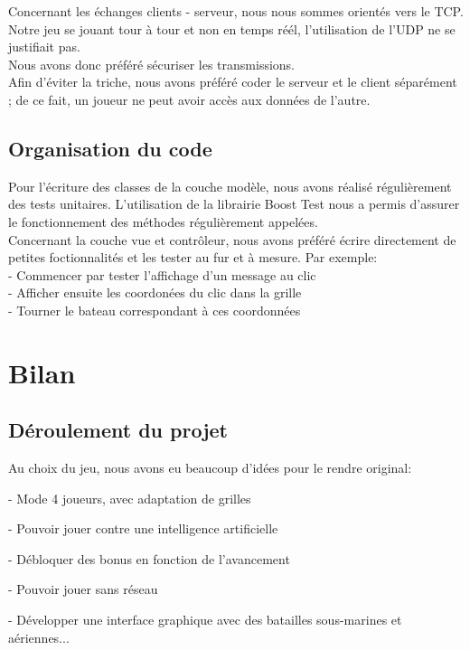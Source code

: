 \documentclass[a4paper,oneside]{article}
\begin{document}
Concernant les échanges clients - serveur, nous nous sommes orientés vers le TCP. 
Notre jeu se jouant tour à tour et non en temps réél, l'utilisation de l'UDP ne se justifiait pas. 
\\
Nous avons donc préféré sécuriser les transmissions.
\\
Afin d'éviter la triche, nous avons préféré coder le serveur et le client séparément ;
de ce fait, un joueur ne peut avoir accès aux données de l'autre. 
\clearpage
\subsection{Organisation du code}

Pour l'écriture des classes de la couche modèle, nous avons réalisé régulièrement des tests unitaires.
L'utilisation de la librairie Boost Test nous a permis d'assurer le fonctionnement des méthodes régulièrement appelées.
\\
Concernant la couche vue et contrôleur, nous avons préféré écrire directement de petites foctionnalités et les tester au fur et à mesure. Par exemple:
\\
	- Commencer par tester l'affichage d'un message au clic
\\
	- Afficher ensuite les coordonées du clic dans la grille
\\
	- Tourner le bateau correspondant à ces coordonnées
\\
\clearpage

\section{Bilan}

\subsection{Déroulement du projet}


Au choix du jeu, nous avons eu beaucoup d'idées pour le rendre original:

 
	- Mode 4 joueurs, avec adaptation de grilles


	- Pouvoir jouer contre une intelligence artificielle 


	- Débloquer des bonus en fonction de l'avancement


	- Pouvoir jouer sans réseau


	- Développer une interface graphique avec des batailles sous-marines et aériennes... 
\\
\end{document}
